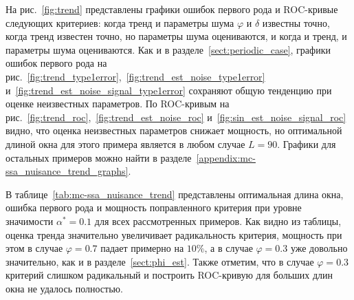 \documentclass[specialist,
substylefile = spbu_report.rtx,
subf,href,colorlinks=true, 12pt]{disser}
\theoremstyle{definition}
\begin{document}
На рис.~\ref{fig:trend} представлены графики ошибок первого рода и ROC-кривые следующих критериев: когда тренд и параметры шума $\varphi$ и $\delta$ известны точно, когда тренд известен точно, но параметры шума оцениваются, и когда и тренд, и параметры шума оцениваются. Как и в разделе~\ref{sect:periodic_case}, графики ошибок первого рода на рис.~\ref{fig:trend_type1error},~\ref{fig:trend_est_noise_type1error} и~\ref{fig:trend_est_noise_signal_type1error} сохраняют общую тенденцию при оценке неизвестных параметров. По ROC-кривым на рис.~\ref{fig:trend_roc},~\ref{fig:trend_est_noise_roc} и~\ref{fig:sin_est_noise_signal_roc} видно, что оценка неизвестных параметров снижает мощность, но оптимальной длиной окна для этого примера является в любом случае $L=90$. Графики для остальных примеров можно найти в разделе~\ref{appendix:mc-ssa_nuisance_trend_graphs}.

В таблице~\ref{tab:mc-ssa_nuisance_trend} представлены оптимальная длина окна, ошибка первого рода и мощность поправленного критерия при уровне значимости $\alpha^*=0.1$ для всех рассмотренных примеров. Как видно из таблицы, оценка тренда значительно увеличивает радикальность критерия, мощность при этом в случае $\varphi=0.7$ падает примерно на $10\%$, а в случае $\varphi=0.3$ уже довольно значительно, как и в разделе~\ref{sect:phi_est}. Также отметим, что в случае $\varphi=0.3$ критерий слишком радикальный и построить ROC-кривую для больших длин окна не удалось полностью.
\end{document}
